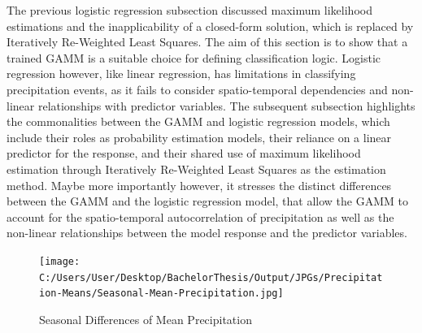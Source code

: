 \documentclass[
  12pt,
]{article}
\begin{document}
\begingroup
\justify

The previous logistic regression subsection discussed maximum likelihood
estimations and the inapplicability of a closed-form solution, which is
replaced by Iteratively Re-Weighted Least Squares. The aim of this
section is to show that a trained GAMM is a suitable choice for defining
classification logic. Logistic regression however, like linear
regression, has limitations in classifying precipitation events, as it
fails to consider spatio-temporal dependencies and non-linear
relationships with predictor variables. The subsequent subsection
highlights the commonalities between the GAMM and logistic regression
models, which include their roles as probability estimation models,
their reliance on a linear predictor for the response, and their shared
use of maximum likelihood estimation through Iteratively Re-Weighted
Least Squares as the estimation method. Maybe more importantly however,
it stresses the distinct differences between the GAMM and the logistic
regression model, that allow the GAMM to account for the spatio-temporal
autocorrelation of precipitation as well as the non-linear relationships
between the model response and the predictor variables.

\begin{figure}[H]
  \begingroup
  \centering
  \texttt{[image: C:/Users/User/Desktop/BachelorThesis/Output/JPGs/Precipitation-Means/Seasonal-Mean-Precipitation.jpg]}
  \caption{Seasonal Differences of Mean Precipitation}
  \label{fig:seasonal_mean_precipitation}
  \endgroup
\end{figure}
\end{document}
